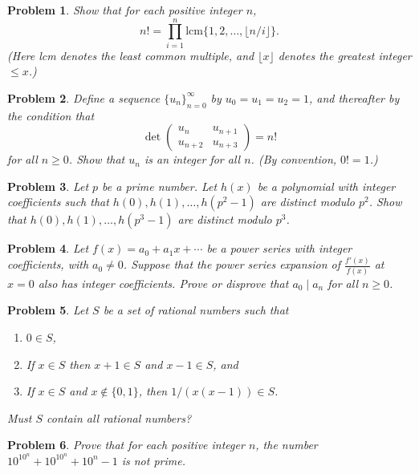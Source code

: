 \documentclass[12pt]{article}
\newtheorem{problem}{Problem}
\begin{document}
\begin{problem}
Show that for each positive integer $n$,
\[
n! = \prod_{i = 1}^n \mathrm{lcm}\{1, 2, \ldots, \lfloor n/i \rfloor\}.
\]
(Here lcm denotes the least common multiple, and $\lfloor x \rfloor$ denotes the greatest integer $\leq x$.)
\end{problem}

\begin{problem}
Define a sequence $\{u_n\}_{n=0}^{\infty}$ by $u_0 = u_1 = u_2 = 1$, and thereafter by the condition that
\[
\det\begin{pmatrix}
u_n & u_{n+1} \\
u_{n+2} & u_{n+3}
\end{pmatrix} = n!
\]
for all $n \geq 0$. Show that $u_n$ is an integer for all $n$. (By convention, $0! = 1$.)
\end{problem}

\begin{problem}
\textbf{\textcolor{red}{\heart}}
Let $p$ be a prime number. Let $h(x)$ be a polynomial with integer coefficients such that $h(0), h(1), \ldots, h(p^2-1)$ are distinct modulo $p^2$. Show that $h(0), h(1), \ldots, h(p^3-1)$ are distinct modulo $p^3$.
\end{problem}

\begin{problem}
Let $f(x) = a_0 + a_1 x + \cdots$ be a power series with integer coefficients, with $a_0 \neq 0$. Suppose that the power series expansion of $\frac{f'(x)}{f(x)}$ at $x = 0$ also has integer coefficients. Prove or disprove that $a_0 \mid a_n$ for all $n \geq 0$.
\end{problem}

\begin{problem}
Let $S$ be a set of rational numbers such that
\begin{enumerate}
    \item $0 \in S$,
    \item If $x \in S$ then $x + 1 \in S$ and $x - 1 \in S$, and
    \item If $x \in S$ and $x \notin \{0, 1\}$, then $1/(x(x - 1)) \in S$.
\end{enumerate}
Must $S$ contain all rational numbers?
\end{problem}

\begin{problem}
\textbf{\textcolor{red}{\heart}}
Prove that for each positive integer $n$, the number $10^{10^{n}} + 10^{10^n} + 10^n - 1$ is not prime.
\end{problem}
\end{document}
